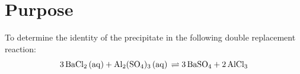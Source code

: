 
\section{Purpose}
To determine the identity of the precipitate in the following double replacement reaction:
$$\rxnpl$$
